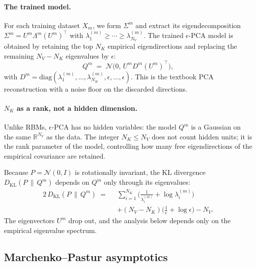 \documentclass[11pt,a4paper]{article}
\theoremstyle{definition}
\theoremstyle{remark}
\newcommand{\KL}{D_{\mathrm{KL}}}
\newcommand{\R}{\mathbb{R}}
\newcommand{\PV}{P}
\newcommand{\QVm}{Q^{m}}
\newcommand{\NK}{N_K}
\newcommand{\NV}{N_V}
\begin{document}
\paragraph{The trained model.}
For each training dataset $X_m$, we form $\Sigma^{m}$ and extract
its eigendecomposition
$\Sigma^{m} = U^{m}\Lambda^{m}(U^{m})^{\top}$ with
$\lambda_{1}^{(m)} \geq \cdots \geq \lambda_{\NV}^{(m)}$. The
trained $\epsilon$-PCA model is obtained by retaining the top
$\NK$ empirical eigendirections and replacing the remaining
$\NV - \NK$ eigenvalues by $\epsilon$:
\begin{equation}
  \QVm
  \;=\; \mathcal{N}\!\big(0,\, U^{m} D^{m} (U^{m})^{\top}\big),
  \label{eq:QVm-block}
\end{equation}
with
$D^{m} = \mathrm{diag}(\lambda_{1}^{(m)},\ldots,
\lambda_{\NK}^{(m)},\epsilon,\ldots,\epsilon)$. This is the
textbook PCA reconstruction with a noise floor on the discarded
directions.

\paragraph{$\NK$ as a rank, not a hidden dimension.}
Unlike RBMs, $\epsilon$-PCA has no hidden variables: the model
$\QVm$ is a Gaussian on the same $\R^{\NV}$ as the data. The
integer $\NK \leq \NV$ does not count hidden units; it is the
rank parameter of the model, controlling how many free
eigendirections of the empirical covariance are retained.

\medskip
Because $\PV = \mathcal{N}(0, I)$ is rotationally invariant, the
KL divergence $\KL(\PV \,\|\, \QVm)$ depends on $\QVm$ only
through its eigenvalues:
\begin{align}
  2\,\KL(\PV \,\|\, \QVm)
  \;=\;\;
  & \sum_{i=1}^{\NK}\!\Big(\frac{1}{\lambda_{i}^{(m)}}
                            + \log\lambda_{i}^{(m)}\Big)
  \nonumber \\
  & + (\NV - \NK)\!\Big(\frac{1}{\epsilon} + \log\epsilon\Big) - \NV.
  \label{eq:GEepca-realisation}
\end{align}
The eigenvectors $U^{m}$ drop out, and the analysis below
depends only on the empirical eigenvalue spectrum.

\subsection{Marchenko--Pastur asymptotics}
\end{document}
